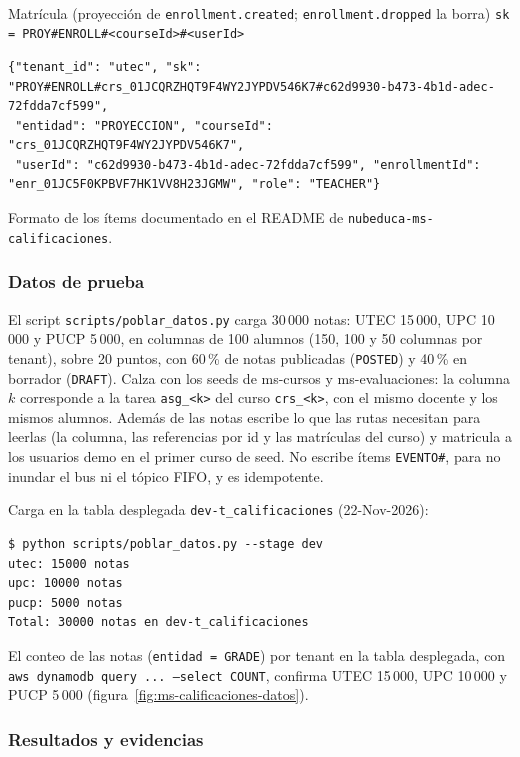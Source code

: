 \paragraph{}Matrícula (proyección de \texttt{enrollment.created}; \texttt{enrollment.dropped} la borra) \textperiodcentered{} \texttt{sk = PROY\#ENROLL\#<courseId>\#<userId>}
\begin{lstlisting}
{"tenant_id": "utec", "sk": "PROY#ENROLL#crs_01JCQRZHQT9F4WY2JYPDV546K7#c62d9930-b473-4b1d-adec-72fdda7cf599",
 "entidad": "PROYECCION", "courseId": "crs_01JCQRZHQT9F4WY2JYPDV546K7",
 "userId": "c62d9930-b473-4b1d-adec-72fdda7cf599", "enrollmentId": "enr_01JC5F0KPBVF7HK1VV8H23JGMW", "role": "TEACHER"}
\end{lstlisting}

Formato de los ítems documentado en el README de \texttt{nubeduca-ms-calificaciones}.

\subsubsection{Datos de prueba}
El script \texttt{scripts/poblar\_datos.py} carga 30\,000 notas: UTEC 15\,000, UPC 10\,000 y PUCP 5\,000, en columnas de 100 alumnos (150, 100 y 50 columnas por tenant), sobre 20 puntos, con 60\,\% de notas publicadas (\texttt{POSTED}) y 40\,\% en borrador (\texttt{DRAFT}). Calza con los seeds de ms-cursos y ms-evaluaciones: la columna $k$ corresponde a la tarea \texttt{asg\_<k>} del curso \texttt{crs\_<k>}, con el mismo docente y los mismos alumnos. Además de las notas escribe lo que las rutas necesitan para leerlas (la columna, las referencias por id y las matrículas del curso) y matricula a los usuarios demo en el primer curso de seed. No escribe ítems \texttt{EVENTO\#}, para no inundar el bus ni el tópico FIFO, y es idempotente.

Carga en la tabla desplegada \texttt{dev-t\_calificaciones} (22-Nov-2026):

\begin{lstlisting}
$ python scripts/poblar_datos.py --stage dev
utec: 15000 notas
upc: 10000 notas
pucp: 5000 notas
Total: 30000 notas en dev-t_calificaciones
\end{lstlisting}

El conteo de las notas (\texttt{entidad = GRADE}) por tenant en la tabla desplegada, con \texttt{aws dynamodb query ... --select COUNT}, confirma UTEC 15\,000, UPC 10\,000 y PUCP 5\,000 (figura~\ref{fig:ms-calificaciones-datos}).


\subsubsection{Resultados y evidencias}
